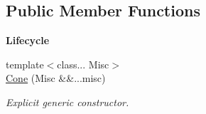 \subsection*{Public Member Functions}
\begin{Indent}{\bf Lifecycle}\par
\begin{DoxyCompactItemize}
\item 
{\footnotesize template$<$class... Misc$>$ }\\\hyperlink{exceptionCone_a7b9c6954d245e3d35d5eb2901c9a086a}{Cone} (Misc \&\&...misc)
\begin{DoxyCompactList}\small\item\em Explicit generic constructor. \end{DoxyCompactList}\end{DoxyCompactItemize}
\end{Indent}
